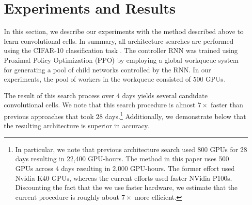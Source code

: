\documentclass[10pt,twocolumn,letterpaper]{article}
\newcommand\todo[1]{{\bf {\textcolor{red}{TODO: #1}}}\\}
\begin{document}
\section{Experiments and Results}In this section, we describe our experiments with the method described above to learn convolutional cells. In summary, all architecture searches are performed using the CIFAR-10 classification task \cite{krizhevsky2009learning}. The controller RNN was trained using Proximal Policy Optimization (PPO) \cite{SchulmanWDRK17} by employing a global workqueue system for generating a pool of child networks controlled by the RNN. In our experiments, the pool of workers in the workqueue consisted of 500 GPUs. 

The result of this search process over 4 days yields several candidate convolutional cells. We note that this search procedure is almost $7\times$ faster than previous approaches \cite{zoph2017neural} that took 28 days.\footnote{In particular, we note that previous architecture search \cite{zoph2017neural} used 800 GPUs for 28 days resulting in 22,400 GPU-hours. The method in this paper uses 500 GPUs across 4 days resulting in 2,000 GPU-hours. The former effort used Nvidia K40 GPUs, whereas the current efforts used faster NVidia P100s. Discounting the fact that the we use faster hardware, we estimate that the current procedure is roughly about $7\times$ more efficient.} Additionally, we demonstrate below that the resulting architecture is superior in accuracy.
\end{document}

